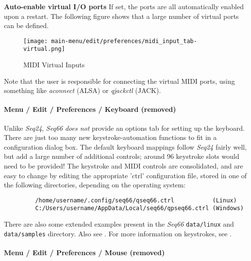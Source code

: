    \textbf{Auto-enable virtual I/O ports}
   If set, the ports are all automatically enabled upon a restart.
   The following figure shows that a large number of virtual ports can be
   defined.

\begin{figure}[H]
   \centering 
   \texttt{[image: main-menu/edit/preferences/midi\_input\_tab-virtual.png]}
   \caption{MIDI Virtual Inputs}
   \label{fig:midi_input_tab}
\end{figure}

   Note that the user is responsible for connecting the virtual MIDI ports,
   using something like \textsl{aconnect} (ALSA) or
   \textsl{qjackctl} (JACK).

\paragraph{Menu / Edit / Preferences / Keyboard (removed)}
\label{paragraph:menu_edit_preferences_keyboard}

   Unlike \textsl{Seq24}, \textsl{Seq66}
   \textsl{does not} provide an options tab for
   setting up the keyboard.
   There are just too many new keystroke-automation functions to fit
   in a configuration dialog box.
   The default keyboard mappings follow \textsl{Seq24} fairly well,
   but add a large number of additional controls;
   around 96 keystroke slots would need to be provided!
   The keystroke and MIDI controls are consolidated, and are easy to change by
   editing the appropriate 'ctrl' configuration file, stored in one of the
   following directories, depending on
   the operating system:
   
   \begin{verbatim}
         /home/username/.config/seq66/qseq66.ctrl           (Linux)
         C:/Users/username/AppData/Local/seq66/qpseq66.ctrl (Windows)
   \end{verbatim}

   There are also some extended examples present in the \textsl{Seq66}
   \texttt{data/linux} and
   \texttt{data/samples} directory.
   Also see .
   For more information on keystrokes, see
   .

\paragraph{Menu / Edit / Preferences / Mouse (removed)}
\label{paragraph:menu_edit_preferences_mouse}

